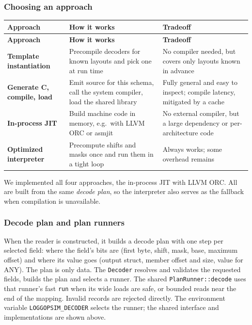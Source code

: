 \documentclass[10pt,a4paper]{article}
\begin{document}
\hypertarget{choosing-an-approach}{}
\subsubsection{Choosing an approach}

{\small
\begin{longtable}{P{0.24\dimexpr{}\tabcolsep\relax}P{0.4\dimexpr{}\tabcolsep\relax}P{0.36\dimexpr{}\tabcolsep\relax}}
\toprule
\textbf{Approach} & \textbf{How it works} & \textbf{Tradeoff} \\
\midrule
\endfirsthead
\toprule
\textbf{Approach} & \textbf{How it works} & \textbf{Tradeoff} \\
\midrule
\endhead
\bottomrule
\endfoot
\textbf{Template instantiation} & Precompile decoders for known layouts and pick one at run time & No compiler needed, but covers only layouts known in advance \\
\textbf{Generate C, compile, load} & Emit source for this schema, call the system compiler, load the shared library & Fully general and easy to inspect; compile latency, mitigated by a cache \\
\textbf{In-process JIT} & Build machine code in memory, e.g.\ with LLVM ORC or asmjit & No external compiler, but a large dependency or per-architecture code \\
\textbf{Optimized interpreter} & Precompute shifts and masks once and run them in a tight loop & Always works; some overhead remains \\
\end{longtable}
}

We implemented all four approaches, the in-process JIT with LLVM ORC. All are built from the same \emph{decode plan}, so the interpreter also serves as the fallback when compilation is unavailable.

\hypertarget{decode-plan-and-generated-decoder}{}
\subsubsection{Decode plan and plan runners}

When the reader is constructed, it builds a decode plan with one step per selected field: where the field's bits are (first byte, shift, mask, base, maximum offset) and where its value goes (output struct, member offset and size, value for ANY). The plan is only data. The \texttt{Decoder} resolves and validates the requested fields, builds the plan and selects a runner. The shared \texttt{PlanRunner::decode} uses that runner's fast \texttt{run} when its wide loads are safe, or bounded reads near the end of the mapping. Invalid records are rejected directly. The environment variable \texttt{LOGGOPSIM\_\allowbreak{}DECODER} selects the runner; the shared interface and implementations are shown above.
\end{document}
